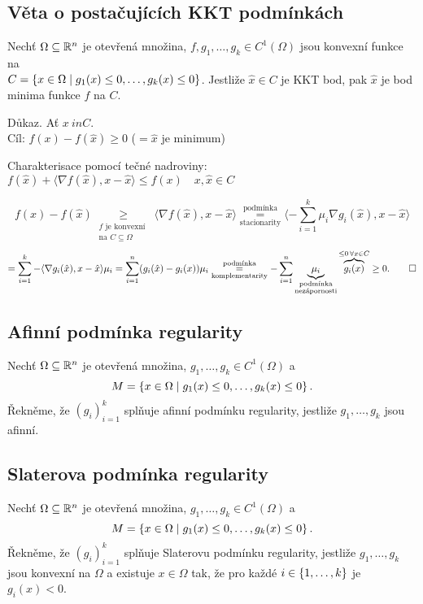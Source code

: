 \subsection{Věta o postačujících KKT podmínkách}
Nechť $\Omega \subseteq \mathbb{R}^n$ je otevřená množina, $f, g_1, \dots, g_k \in C^1(\Omega)$ jsou konvexní funkce na \\
$C = \left\lbrace x \in \Omega \mid g_1(x) \leq 0, \dots, g_k(x) \leq 0 \right\rbrace$. Jestliže $\hat x \in C$ je KKT bod, pak $\hat x$ je bod 
minima funkce $f$ na $C$.

Důkaz. Ať $x \ in C$. \\
Cíl: $f(x) - f(\hat x) \geq 0$ ($= \hat x$ je minimum)

Charakterisace pomocí tečné nadroviny: $f(\hat x) + \langle \nabla f(\hat x), x - \hat x\rangle \leq f(x) \quad x, 
\hat x \in C$

\[
    f(x) - f(\hat x) \underset{\substack{\text{$f$ je konvexní } \\ \text{na $C \subseteq \Omega$}} }{\geq} \langle 
    \nabla f(\hat x), x - \hat x\rangle \underset{\text{stacionarity}}{\overset{\text{podmínka}}{=}} \langle - \sum_{i=1}^{k} \mu_i \nabla g_i(\hat x), 
    x - \hat x\rangle
\]
\[
    = \sum_{i=1}^{k} - \langle \nabla g_i(\hat x), x - \hat x \rangle \mu_i = \sum_{i=1}^{n} (g_i(\hat x) - g_i(x)) \mu_i 
    \underset{\text{komplementarity}}{\overset{\text{podmínka}}{=}} - \sum_{i=1}^{n}    
    \underbrace{\mu_i}_{\substack{\text{podmínka}\\ \text{nezápornosti}}} \overbrace{g_i(x)}^{\leq 0 \, \forall x \in C}
    \geq 0. \qed
\]

\subsection{Afinní podmínka regularity}\label{afinniPodm}
Nechť $\Omega \subseteq \mathbb{R}^n$ je otevřená množina, $g_1, \dots, g_k \in C^1 (\Omega)$ a 
\[
    M = \left\lbrace x \in \Omega \mid g_1(x) \leq 0, \dots, g_k(x) \leq 0 \right\rbrace.
\]
Řekněme, že $(g_i)_{i=1}^k$ splňuje afinní podmínku regularity, jestliže $g_1, \dots, g_k$ jsou afinní.

\subsection{Slaterova podmínka regularity}\label{slaterPodm}
Nechť $\Omega \subseteq \mathbb{R}^n$ je otevřená množina, $g_1, \dots, g_k \in C^1 (\Omega)$ a 
\[
    M = \left\lbrace x \in \Omega \mid g_1(x) \leq 0, \dots, g_k(x) \leq 0 \right\rbrace.
\]
Řekněme, že $(g_i)_{i=1}^k$ splňuje Slaterovu podmínku regularity, jestliže $g_1, \dots, g_k$ jsou konvexní na $\Omega$
a existuje $x \in \Omega$ tak, že pro každé $i \in \left\lbrace 1, \dots, k \right\rbrace$ je $g_i(x) < 0$.

